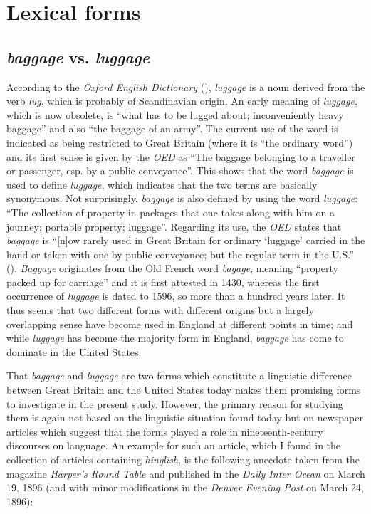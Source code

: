 \section{Lexical forms}
\label{bkm:Ref523382196}\hypertarget{Toc63021228}{}\label{bkm:Ref523762437}\subsection{\textit{baggage} vs. \textit{luggage}}
\hypertarget{Toc63021229}{}
According to the \emph{Oxford English Dictionary} (\citeyear{luggage}), \emph{luggage} is a noun derived from the verb \emph{lug}, which is probably of Scandinavian origin. An early meaning of \emph{luggage}, which is now obsolete, is “what has to be lugged about; inconveniently heavy baggage” and also “the baggage of an army”. The current use of the word is indicated as being restricted to Great Britain (where it is “the ordinary word”) and its first sense is given by the \emph{OED} as “The baggage belonging to a traveller or passenger, esp. by a public conveyance”. This shows that the word \emph{baggage} is used to define \emph{luggage}, which indicates that the two terms are basically synonymous. Not surprisingly, \emph{baggage} is also defined by using the word \emph{luggage}: “The collection of property in packages that one takes along with him on a journey; portable property; luggage”. Regarding its use, the \emph{OED} states that \emph{baggage} is “[n]ow rarely used in Great Britain for ordinary ‘luggage’ carried in the hand or taken with one by public conveyance; but the regular term in the U.S.” (\citeyear{baggage}). \emph{Baggage} originates from the Old French word \emph{bagage}, meaning “property packed up for carriage” and it is first attested in 1430, whereas the first occurrence of \emph{luggage} is dated to 1596, so more than a hundred years later. It thus seems that two different forms with different origins but a largely overlapping sense have become used in England at different points in time; and while \emph{luggage} has become the majority form in England, \emph{baggage} has come to dominate in the United States.


That \emph{baggage} and \emph{luggage} are two forms which constitute a linguistic difference between Great Britain and the United States today makes them promising forms to investigate in the present study. However, the primary reason for studying them is again not based on the linguistic situation found today but on newspaper articles which suggest that the forms played a role in nineteenth-century discourses on language. An example for such an article, which I found in the collection of articles containing \emph{hinglish}, is the following anecdote taken from the magazine \emph{Harper’s Round Table} and published in the \emph{Daily Inter Ocean} on March 19, 1896
(and with minor modifications in the \textit{Denver Evening Post} on March 24, 1896):

